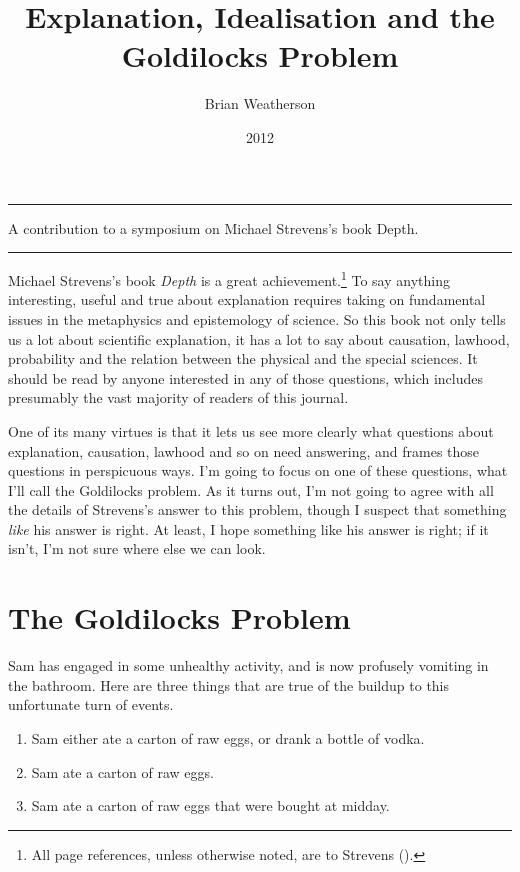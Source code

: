 \documentclass[
  10pt,
  letterpaper,
  DIV=11,
  numbers=noendperiod,
  twoside]{scrartcl}
\title{Explanation, Idealisation and the Goldilocks Problem}
\author{Brian Weatherson}
\date{2012}
\providecommand{\tightlist}{%
  \setlength{\itemsep}{0pt}\setlength{\parskip}{0pt}}\usepackage{longtable,booktabs,array}
\renewenvironment{abstract}
 {\vspace{-1.25cm}
 \quotation\small\noindent\rule{\linewidth}{.5pt}\par\smallskip
 \noindent }
 {\par\noindent\rule{\linewidth}{.5pt}\endquotation}
\begin{document}
\maketitle
\begin{abstract}
A contribution to a symposium on Michael Strevens's book Depth.
\end{abstract}

Michael Strevens's book \emph{Depth} is a great achievement.\footnote{All
  page references, unless otherwise noted, are to Strevens
  ().} To say anything interesting,
useful and true about explanation requires taking on fundamental issues
in the metaphysics and epistemology of science. So this book not only
tells us a lot about scientific explanation, it has a lot to say about
causation, lawhood, probability and the relation between the physical
and the special sciences. It should be read by anyone interested in any
of those questions, which includes presumably the vast majority of
readers of this journal.

One of its many virtues is that it lets us see more clearly what
questions about explanation, causation, lawhood and so on need
answering, and frames those questions in perspicuous ways. I'm going to
focus on one of these questions, what I'll call the Goldilocks problem.
As it turns out, I'm not going to agree with all the details of
Strevens's answer to this problem, though I suspect that something
\emph{like} his answer is right. At least, I hope something like his
answer is right; if it isn't, I'm not sure where else we can look.

\section{The Goldilocks Problem}\label{the-goldilocks-problem}

Sam has engaged in some unhealthy activity, and is now profusely
vomiting in the bathroom. Here are three things that are true of the
buildup to this unfortunate turn of events.

\begin{enumerate}
\def\labelenumi{\arabic{enumi}.}
\tightlist
\item
  Sam either ate a carton of raw eggs, or drank a bottle of vodka.
\item
  Sam ate a carton of raw eggs.
\item
  Sam ate a carton of raw eggs that were bought at midday.
\end{enumerate}
\end{document}

